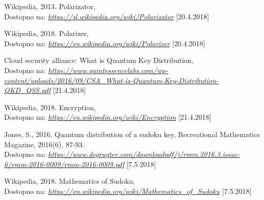 \documentclass[A4paper, 11pt]{article}
\begin{document}
\begin{thebibliography}{9}
	Wikipedia, 2013. Polarizator,  \\
	Dostopno na:
	\textit{\url{https://sl.wikipedia.org/wiki/Polarizator}}
	[20.4.2018]

	Wikipedia, 2018. Polarizer,  \\
	Dostopno na:
	\textit{\url{https://en.wikipedia.org/wiki/Polarizer}}
	[20.4.2018]

	Cloud security alliance: What is Quantum Key Distribution,  \\
	Dostopno na:
	\textit{\url{https://www.quintessencelabs.com/wp-content/uploads/2016/09/CSA_What-is-Quantum-Key-Distribution-QKD_QSS.pdf}}
	[21.4.2018]

	Wikipedia, 2018. Encryption,  \\
	Dostopno na:
	\textit{\url{https://en.wikipedia.org/wiki/Encryption}}
	[21.4.2018]

	Jones, S., 2016. Quantum distribution of a sudoku key, Recreational Mathematics Magazine, 2016(6), 87-93. \\
	Dostopno na:
	\textit{\url{https://www.degruyter.com/downloadpdf/j/rmm.2016.3.issue-6/rmm-2016-0009/rmm-2016-0009.pdf}}
	[7.5.2018]

	Wikipedia, 2018. Mathematics of Sudoku,  \\
	Dostopno na:
	\textit{\url{https://en.wikipedia.org/wiki/Mathematics_of_Sudoku}}
	[7.5.2018]

\end{thebibliography}
\end{document}
